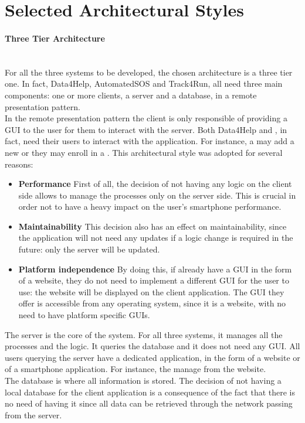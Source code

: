 \documentclass[../../DD.tex]{subfiles}
\begin{document}
\section{Selected Architectural Styles}
	\paragraph{Three Tier Architecture}\mbox{}\\
	For all the three systems to be developed, the chosen architecture is a three tier one. In fact, Data4Help, AutomatedSOS and Track4Run, all need three main components: one or more clients, a server and a database, in a remote presentation pattern.\\
	In the remote presentation pattern the client is only responsible of providing a GUI to the user for them to interact with the server. Both Data4Help and , in fact, need their users to interact with the application. For instance, a  may add a new  or they may enroll in a . This architectural style was adopted for several reasons:
	\begin{itemize}
		\item\textbf{Performance} First of all, the decision of not having any logic on the client side allows to manage the processes only on the server side. This is crucial in order not to have a heavy impact on the user's smartphone performance.
		\item\textbf{Maintainability} This decision also has an effect on maintainability, since the application will not need any updates if a logic change is required in the future: only the server will be updated.
		\item\textbf{Platform independence} By doing this, if  already have a GUI in the form of a website, they do not need to implement a different GUI for the user to use: the  website will be displayed on the client application. The GUI they offer is accessible from any operating system, since it is a website, with no need to have platform specific GUIs.
	\end{itemize}
	The server is the core of the system. For all three systems, it manages all the processes and the logic. It queries the database and it does not need any GUI. All users querying the server have a dedicated application, in the form of a website or of a smartphone application. For instance, the  manage  from the  website.\\
	The database is where all information is stored. The decision of not having a local database for the client application is a consequence of the fact that there is no need of having it since all data can be retrieved through the network passing from the server.
\end{document}
